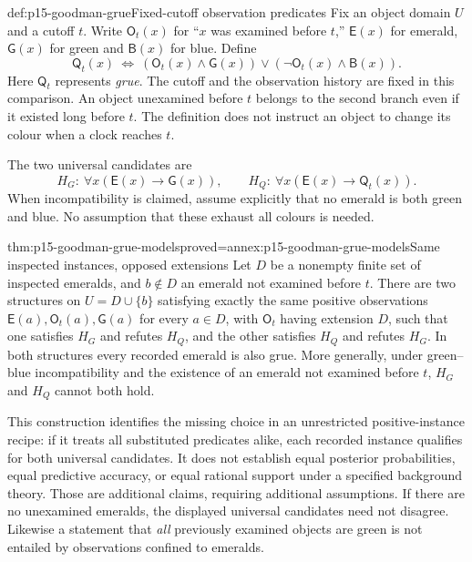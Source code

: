 \begin{hbdefinition}{def:p15-goodman-grue}{Fixed-cutoff observation predicates}
Fix an object domain $U$ and a cutoff $t$. Write $\mathsf{O}_t(x)$ for
``$x$ was examined before $t$,'' $\mathsf{E}(x)$ for emerald,
$\mathsf{G}(x)$ for green and $\mathsf{B}(x)$ for blue. Define
\[
 \mathsf{Q}_t(x)\ \Longleftrightarrow\
 (\mathsf{O}_t(x)\land\mathsf{G}(x))\lor
 (\neg\mathsf{O}_t(x)\land\mathsf{B}(x)).
\]
Here $\mathsf{Q}_t$ represents \emph{grue}. The cutoff and the observation
history are fixed in this comparison. An object unexamined before $t$
belongs to the second branch even if it existed long before $t$.
The definition does not instruct an object to change its colour when a
clock reaches $t$.

The two universal candidates are
\[
 H_G:\ \forall x(\mathsf{E}(x)\to\mathsf{G}(x)),\qquad
 H_Q:\ \forall x(\mathsf{E}(x)\to\mathsf{Q}_t(x)).
\]
When incompatibility is claimed, assume explicitly that no emerald is
both green and blue. No assumption that these exhaust all colours is needed.
\end{hbdefinition}

\begin{hbtheorem}{thm:p15-goodman-grue-models}{proved=annex:p15-goodman-grue-models}{Same inspected instances, opposed extensions}
Let $D$ be a nonempty finite set of inspected emeralds, and $b\notin D$
an emerald not examined before $t$. There are two structures on
$U=D\cup\{b\}$ satisfying exactly the same positive observations
$\mathsf{E}(a),\mathsf{O}_t(a),\mathsf{G}(a)$ for every $a\in D$,
with $\mathsf{O}_t$ having extension $D$, such that one satisfies $H_G$
and refutes $H_Q$, and the other satisfies $H_Q$ and refutes $H_G$.
In both structures every recorded emerald is also grue. More generally,
under green--blue incompatibility and the existence of an emerald not
examined before $t$, $H_G$ and $H_Q$ cannot both hold.
\end{hbtheorem}

This construction identifies the missing choice in an unrestricted
positive-instance recipe: if it treats all substituted predicates alike,
each recorded instance qualifies for both universal candidates. It does
not establish equal posterior probabilities, equal predictive accuracy,
or equal rational support under a specified background theory. Those are
additional claims, requiring additional assumptions. If there are no
unexamined emeralds, the displayed universal candidates need not disagree.
Likewise a statement that \emph{all} previously examined objects are green
is not entailed by observations confined to emeralds.

